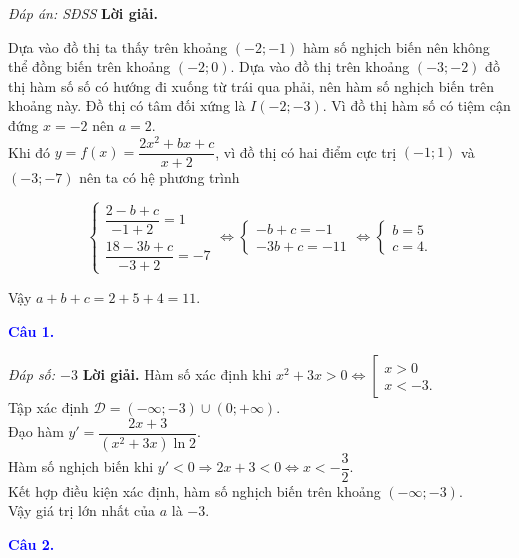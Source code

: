 \documentclass[12pt,a4paper]{article}
\begin{document}
\noindent \textit{Đáp án: SĐSS}
\noindent\textbf{Lời giải. } \begin{itemchoice}
			\itemch
			Dựa vào đồ thị ta thấy trên khoảng $(-2;-1)$ hàm số nghịch biến nên không thể đồng biến trên khoảng $(-2;0)$.
			\itemch
			Dựa vào đồ thị trên khoảng $(-3;-2)$ đồ thị hàm số số có hướng đi xuống từ trái qua phải, nên hàm số nghịch biến trên khoảng này.
			\itemch	
			Đồ thị có tâm đối xứng là $I(-2;-3)$.
			\itemch
			Vì đồ thị hàm số có tiệm cận đứng $x=-2$ nên $a=2$.\\

			Khi đó $y=f(x)=\dfrac{2x^2+bx+c}{x+2}$, vì đồ thị có hai điểm cực trị $(-1;1)$ và $(-3;-7)$ nên ta có hệ phương trình
			
$$\begin{cases}\dfrac{2-b+c}{-1+2}=1\\\dfrac{18-3b+c}{-3+2}=-7\end{cases}\Leftrightarrow \begin{cases}-b+c=-1\\-3b+c=-11\end{cases}\Leftrightarrow \begin{cases}b=5\\c=4.\end{cases}$$

			Vậy $a+b+c=2+5+4=11$.
		\end{itemchoice}

\medskip
\noindent\textcolor{blue}{\textbf{Câu 1.}}

\noindent \textit{Đáp số: $-3$}
\noindent\textbf{Lời giải. } Hàm số xác định khi $x^2+3x>0\Leftrightarrow \left[\begin{array}{l}x>0\\x<-3.\end{array}\right.$\\

		Tập xác định $\mathscr{D}=(-\infty;-3)\cup(0;+\infty)$.\\

		Đạo hàm $y'=\dfrac{2x+3}{(x^2+3x)\ln 2}$.\\

		Hàm số nghịch biến khi $y'<0\Rightarrow 2x+3<0\Leftrightarrow x<-\dfrac{3}{2}$.\\

		Kết hợp điều kiện xác định, hàm số nghịch biến trên khoảng $(-\infty;-3)$.\\

		Vậy giá trị lớn nhất của $a$ là $-3$.

\medskip
\noindent\textcolor{blue}{\textbf{Câu 2.}}
\end{document}
